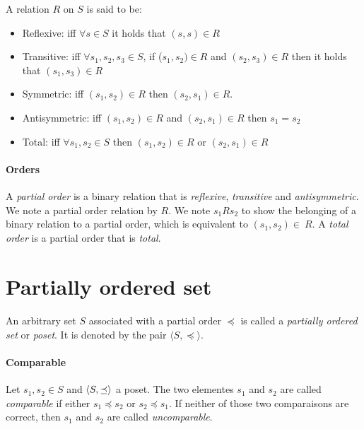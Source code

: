 \documentclass[letterpaper]{memoir}
\DeclarePairedDelimiter{\tuple}{\langle}{\rangle}
\begin{document}
A relation $R$ on $S$ is said to be:

\begin{itemize}
    \item Reflexive:
    iff $\forall s \in S$ it holds that $(s, s) \in R$
    \item Transitive:
    iff $\forall s_1, s_2, s_3 \in S$,
    if ($s_1, s_2) \in R$ and $(s_2, s_3) \in R$
    then it holds that $(s_1, s_3) \in R$
    \item Symmetric: iff $(s_1, s_2) \in R$ then $(s_2, s_1) \in R$.
    \item Antisymmetric: iff $(s_1, s_2) \in R$
    and $(s_2, s_1) \in R$ then $s_1 = s_2$
    \item Total: iff $\forall s_1, s_2 \in S$ then $(s_1, s_2) \in R$
    or $(s_2, s_1) \in R$

\end{itemize}

\paragraph{Orders}

A \textit{partial order} is a binary relation that is \textit{reflexive},
\textit{transitive} and \textit{antisymmetric}. We note a
partial order relation by $R$.
We note $s_1 R  s_2$ to show the belonging of
a binary relation to a partial order, which is equivalent
to $(s_1, s_2) \in \ R$.
A \textit{total order} is a partial order that is \textit{total}.

\section{Partially ordered set}

\paragraph{}

An arbitrary set $S$ associated with a partial order $\preceq$
is called a \textit{partially ordered set} or \textit{poset}.
It is denoted by the pair $\langle S, \preceq \rangle$.

\paragraph{Comparable}

Let $s_1, s_2 \in S$ and $\tuple{S, \preceq}$ a poset.
The two elementes $s_1$ and $s_2$ are called \textit{comparable} if either
$s_1 \preceq s_2$ or $s_2 \preceq s_1$. If neither of those two comparaisons
are correct, then $s_1$ and $s_2$ are called \textit{uncomparable}.
\end{document}
